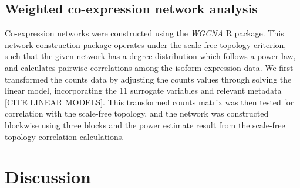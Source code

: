 \subsection{Weighted co-expression network analysis}
Co-expression networks were constructed using the \textit{WGCNA} R package. This network construction package operates under the scale-free topology criterion, such that the given network has a degree distribution which follows a power law, and calculates pairwise correlations among the isoform expression data. We first transformed the counts data by adjusting the counts values through solving the linear model, incorporating the 11 surrogate variables and relevant metadata [CITE LINEAR MODELS]. This transformed counts matrix was then tested for correlation with the scale-free topology, and the network was constructed blockwise using three blocks and the power estimate result from the scale-free topology correlation calculations. 

\section{Discussion}